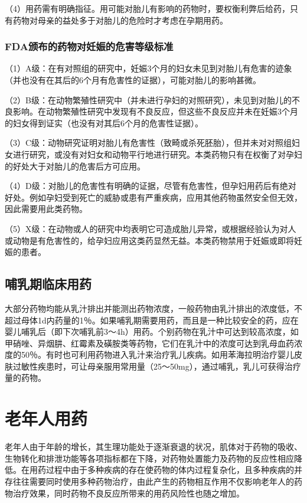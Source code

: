 （4）用药需有明确指征。用可能对胎儿有影响的药物时，要权衡利弊后给药，只有药物对母亲的益处多于对胎儿的危险时才考虑在孕期用药。

\subsubsection{FDA颁布的药物对妊娠的危害等级标准}

（1）A级：在有对照组的研究中，妊娠3个月的妇女未见到对胎儿有危害的迹象（并也没有在其后的6个月有危害性的证据），可能对胎儿的影响甚微。

（2）B级：在动物繁殖性研究中（并未进行孕妇的对照研究），未见到对胎儿的不良影响。在动物繁殖性研究中发现有不良反应，但这些不良反应并未在妊娠3个月的妇女得到证实（也没有对其后6个月的危害性证据）。

（3）C级：动物研究证明对胎儿有危害性（致畸或杀死胚胎），但并未对对照组妇女进行研究，或没有对妇女和动物平行地进行研究。本类药物只有在权衡了对孕妇的好处大于对胎儿的危害后方可应用。

（4）D级：对胎儿的危害性有明确的证据，尽管有危害性，但孕妇用药后有绝对好处。例如孕妇受到死亡的威胁或患有严重疾病，应用其他药物虽然安全但无效，因此需要用此类药物。

（5）X级：在动物或人的研究中均表明它可造成胎儿异常，或根据经验认为对人或动物是有危害性的，给孕妇应用这类药显然无益。本类药物禁用于妊娠或即将妊娠的患者。

\subsection{哺乳期临床用药}

大部分药物均能从乳汁排出并能测出药物浓度，一般药物由乳汁排出的浓度低，不超过母体1d内药量的1％。如果哺乳期需要用药，而且是一种比较安全的药，应在婴儿哺乳后（即下次哺乳前3～4h）用药。个别药物在乳汁中可达到较高浓度，如甲硝唑、异烟肼、红霉素及磺胺类等药物，它们在乳汁中的浓度可达到乳母血药浓度的50％。有时也可利用药物进入乳汁来治疗乳儿疾病。如用苯海拉明治疗婴儿皮肤过敏性疾患时，可让母亲服用常用量（25～50mg），通过哺乳，乳儿可获得治疗量的药物。

\section{老年人用药}

老年人由于年龄的增长，其生理功能处于逐渐衰退的状况，肌体对于药物的吸收、生物转化和排泄功能等各项指标都在下降，对药物处置能力及药物的反应性相应降低。在用药过程中由于多种疾病的存在使药物的体内过程复杂化，且多种疾病的并存往往需要同时使用多种药物治疗，由此产生的药物相互作用不仅影响老年人的药物治疗效果，同时药物不良反应所带来的用药风险性也随之增加。

